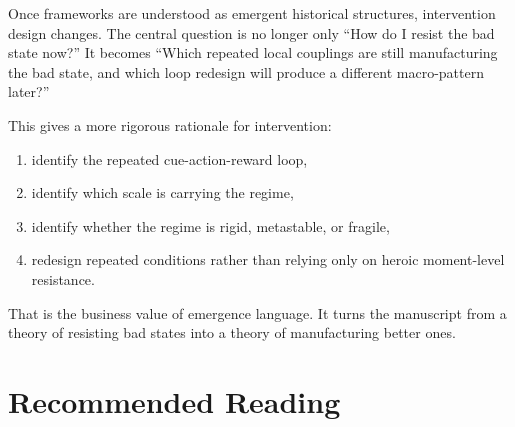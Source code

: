 Once frameworks are understood as emergent historical structures, intervention
design changes. The central question is no longer only ``How do I resist the
bad state now?'' It becomes ``Which repeated local couplings are still
manufacturing the bad state, and which loop redesign will produce a different
macro-pattern later?''

This gives a more rigorous rationale for intervention:
\begin{enumerate}[nosep]
  \item identify the repeated cue-action-reward loop,
  \item identify which scale is carrying the regime,
  \item identify whether the regime is rigid, metastable, or fragile,
  \item redesign repeated conditions rather than relying only on heroic
        moment-level resistance.
\end{enumerate}

That is the business value of emergence language. It turns the manuscript from
a theory of resisting bad states into a theory of manufacturing better ones.

\section{Recommended Reading}

